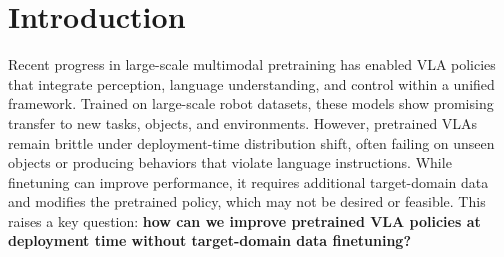 





\section{Introduction}

Recent progress in large-scale multimodal pretraining has enabled VLA policies~\citep{black2410pi0,bjorck2025gr00t,kim2024openvla,zitkovich2023rt,pertsch2025fast} that integrate perception, language understanding, and control within a unified framework. Trained on large-scale robot datasets, these models show promising transfer to new tasks, objects, and environments. However, pretrained VLAs remain brittle under deployment-time distribution shift, often failing on unseen objects or producing behaviors that violate language instructions. While finetuning can improve performance, it requires additional target-domain data and modifies the pretrained policy, which may not be desired or feasible. This raises a key question: \textbf{how can we improve pretrained VLA policies at deployment time without target-domain data finetuning?}

